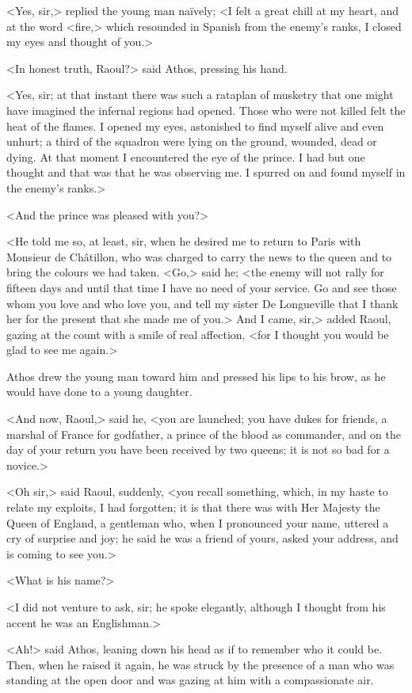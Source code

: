 <Yes, sir,> replied the young man naïvely; <I felt a great chill at my heart, and at the word <fire,> which resounded in Spanish from the enemy's ranks, I closed my eyes and thought of you.>

<In honest truth, Raoul?> said Athos, pressing his hand.

<Yes, sir; at that instant there was such a rataplan of musketry that one might have imagined the infernal regions had opened. Those who were not killed felt the heat of the flames. I opened my eyes, astonished to find myself alive and even unhurt; a third of the squadron were lying on the ground, wounded, dead or dying. At that moment I encountered the eye of the prince. I had but one thought and that was that he was observing me. I spurred on and found myself in the enemy's ranks.>

<And the prince was pleased with you?>

<He told me so, at least, sir, when he desired me to return to Paris with Monsieur de Châtillon, who was charged to carry the news to the queen and to bring the colours we had taken. <Go,> said he; <the enemy will not rally for fifteen days and until that time I have no need of your service. Go and see those whom you love and who love you, and tell my sister De Longueville that I thank her for the present that she made me of you.> And I came, sir,> added Raoul, gazing at the count with a smile of real affection, <for I thought you would be glad to see me again.>

Athos drew the young man toward him and pressed his lips to his brow, as he would have done to a young daughter.

<And now, Raoul,> said he, <you are launched; you have dukes for friends, a marshal of France for godfather, a prince of the blood as commander, and on the day of your return you have been received by two queens; it is not so bad for a novice.>

<Oh sir,> said Raoul, suddenly, <you recall something, which, in my haste to relate my exploits, I had forgotten; it is that there was with Her Majesty the Queen of England, a gentleman who, when I pronounced your name, uttered a cry of surprise and joy; he said he was a friend of yours, asked your address, and is coming to see you.>

<What is his name?>

<I did not venture to ask, sir; he spoke elegantly, although I thought from his accent he was an Englishman.>

<Ah!> said Athos, leaning down his head as if to remember who it could be. Then, when he raised it again, he was struck by the presence of a man who was standing at the open door and was gazing at him with a compassionate air.

